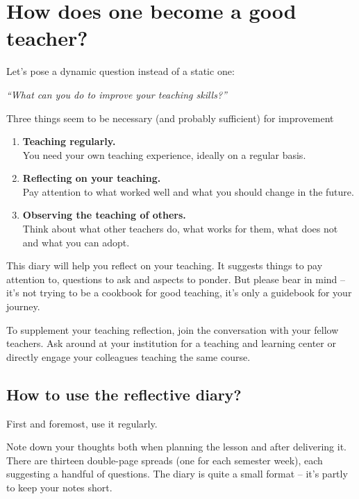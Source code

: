 
\chapter*{How does one become a good teacher?}

\vspace*{1em}
Let's pose a dynamic question instead of a static one:

\vspace*{1em}
\textit{\large \enquote{What can you do to improve your teaching skills?}}

\vspace*{1em}
Three things seem to be necessary (and probably sufficient) for improvement\footnotemark
{}
\begin{enumerate}
\item \textbf{Teaching regularly.}\\You need your own teaching experience, ideally on a regular basis.
\item \textbf{Reflecting on your teaching.}\\Pay attention to what worked well and what you should change in the future.
\item \textbf{Observing the teaching of others.}\\Think about what other teachers do, what works for them, what does not and what you can adopt.
\end{enumerate}

This diary will help you reflect on your teaching. It suggests things to pay attention to, questions to ask and aspects to ponder. But please bear in mind -- it's not trying to be a cookbook for good teaching, it's only a guidebook for your journey.

To supplement your teaching reflection, join the conversation with your fellow teachers. Ask around at your institution for a teaching and learning center or directly engage your colleagues teaching the same course.

\newpage
\section*{How to use the reflective diary?}

First and foremost, use it regularly.

Note down your thoughts both when planning the lesson and after delivering it. There are thirteen double-page spreads (one for each semester week), each suggesting a handful of questions. The diary is quite a small format -- it's partly to keep your notes short.

